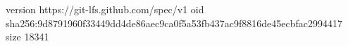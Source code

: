 version https://git-lfs.github.com/spec/v1
oid sha256:9d8791960f33449dd4de86aec9ca0f5a53fb437ac9f8816de45ecbfac2994417
size 18341
